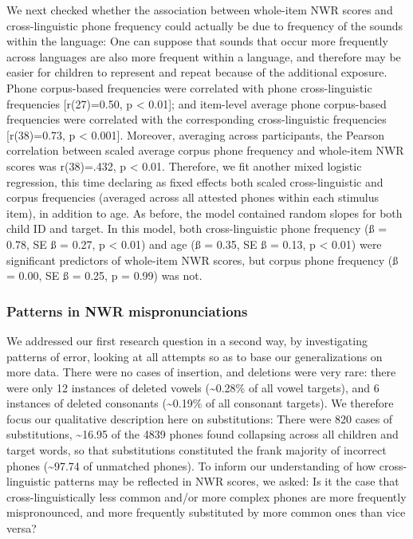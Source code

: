 \documentclass[english,,man,floatsintext]{apa6}
\begin{document}
We next checked whether the association between whole-item NWR scores and cross-linguistic phone frequency could actually be due to frequency of the sounds within the language: One can suppose that sounds that occur more frequently across languages are also more frequent within a language, and therefore may be easier for children to represent and repeat because of the additional exposure. Phone corpus-based frequencies were correlated with phone cross-linguistic frequencies {[}r(27)=0.50, p \textless{} 0.01{]}; and item-level average phone corpus-based frequencies were correlated with the corresponding cross-linguistic frequencies {[}r(38)=0.73, p \textless{} 0.001{]}. Moreover, averaging across participants, the Pearson correlation between scaled average corpus phone frequency and whole-item NWR scores was r(38)=.432, p \textless{} 0.01. Therefore, we fit another mixed logistic regression, this time declaring as fixed effects both scaled cross-linguistic and corpus frequencies (averaged across all attested phones within each stimulus item), in addition to age. As before, the model contained random slopes for both child ID and target. In this model, both cross-linguistic phone frequency (ß = 0.78, SE ß = 0.27, p \textless{} 0.01) and age (ß = 0.35, SE ß = 0.13, p \textless{} 0.01) were significant predictors of whole-item NWR scores, but corpus phone frequency (ß = 0.00, SE ß = 0.25, p = 0.99) was not.

\hypertarget{patterns-in-nwr-mispronunciations}{%
\subsubsection{Patterns in NWR mispronunciations}\label{patterns-in-nwr-mispronunciations}}

We addressed our first research question in a second way, by investigating patterns of error, looking at all attempts so as to base our generalizations on more data. There were no cases of insertion, and deletions were very rare: there were only 12 instances of deleted vowels (\textasciitilde{}0.28\% of all vowel targets), and 6 instances of deleted consonants (\textasciitilde{}0.19\% of all consonant targets). We therefore focus our qualitative description here on substitutions: There were 820 cases of substitutions, \textasciitilde{}16.95 of the 4839 phones found collapsing across all children and target words, so that substitutions constituted the frank majority of incorrect phones (\textasciitilde{}97.74 of unmatched phones). To inform our understanding of how cross-linguistic patterns may be reflected in NWR scores, we asked: Is it the case that cross-linguistically less common and/or more complex phones are more frequently mispronounced, and more frequently substituted by more common ones than vice versa?
\end{document}
